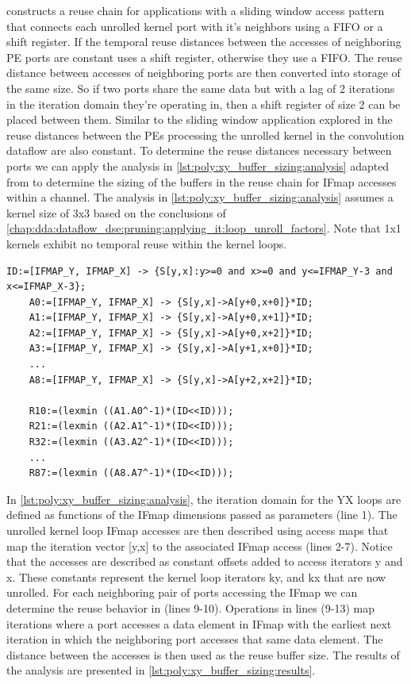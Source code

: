 \cite{meeus} constructs a reuse chain for applications with a sliding window
access pattern that connects each unrolled kernel port with it's neighbors using
a FIFO or a shift register. If the temporal reuse distances between the accesses
of neighboring PE ports are constant \cite{meeus} uses a shift register,
otherwise they use a FIFO. The reuse distance between accesses of neighboring
ports are then converted into storage of the same size. So if two ports share
the same data but with a lag of 2 iterations in the iteration domain they're
operating in, then a shift register of size 2 can be placed between them.
Similar to the sliding window application explored in \cite{meeus} the reuse
distances between the PEs processing the unrolled kernel in the convolution
dataflow are also constant. To determine the reuse distances necessary between
ports we can apply the analysis in \autoref{lst:poly:xy_buffer_sizing:analysis}
adapted from \cite{meeus} to determine the sizing of the buffers in the reuse
chain for IFmap accesses within a channel. The analysis in
\autoref{lst:poly:xy_buffer_sizing:analysis} assumes a kernel size of 3x3 based
on the conclusions of
\autoref{chap:dda:dataflow_dse:pruning:applying_it:loop_unroll_factors}. Note
that 1x1 kernels exhibit no temporal reuse within the kernel loops.  

\begin{lstlisting}[caption=Determining buffer sizes in 3x3 convolutions, label={lst:poly:xy_buffer_sizing:analysis}]
    ID:=[IFMAP_Y, IFMAP_X] -> {S[y,x]:y>=0 and x>=0 and y<=IFMAP_Y-3 and x<=IFMAP_X-3};
    A0:=[IFMAP_Y, IFMAP_X] -> {S[y,x]->A[y+0,x+0]}*ID;
    A1:=[IFMAP_Y, IFMAP_X] -> {S[y,x]->A[y+0,x+1]}*ID;
    A2:=[IFMAP_Y, IFMAP_X] -> {S[y,x]->A[y+0,x+2]}*ID;
    A3:=[IFMAP_Y, IFMAP_X] -> {S[y,x]->A[y+1,x+0]}*ID;
    ...
    A8:=[IFMAP_Y, IFMAP_X] -> {S[y,x]->A[y+2,x+2]}*ID;

    R10:=(lexmin ((A1.A0^-1)*(ID<<ID)));
    R21:=(lexmin ((A2.A1^-1)*(ID<<ID)));
    R32:=(lexmin ((A3.A2^-1)*(ID<<ID)));
    ...
    R87:=(lexmin ((A8.A7^-1)*(ID<<ID)));
\end{lstlisting}

In \autoref{lst:poly:xy_buffer_sizing:analysis}, the iteration domain for the YX
loops are defined as functions of the IFmap dimensions passed as parameters (line 1).
The unrolled kernel loop IFmap accesses are then described using access maps
that map the iteration vector [y,x] to the associated IFmap access (lines 2-7).
Notice that the accesses are described as constant offsets added to access iterators y
and x. These constants represent the kernel loop iterators ky, and kx that are now
unrolled. For each neighboring pair of ports accessing the IFmap we can
determine the reuse behavior in (lines 9-10). Operations in lines (9-13) map
iterations where a port accesses a data element in IFmap with the earliest next
iteration in which the neighboring port accesses that same data element. The
distance between the accesses is then used as the reuse buffer size. The results
of the analysis are presented in \autoref{lst:poly:xy_buffer_sizing:results}.

